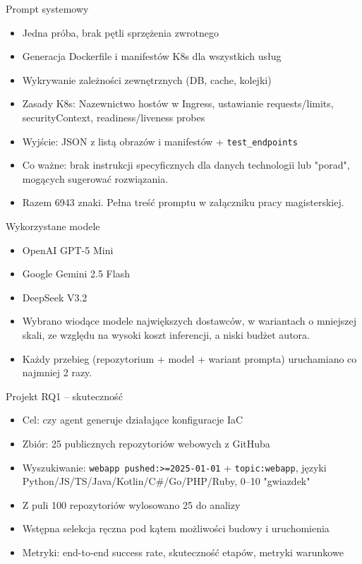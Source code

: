 \documentclass[aspectratio=169]{beamer}
\begin{document}
\begin{frame}{Prompt systemowy}
    \begin{itemize}
        \item Jedna próba, brak pętli sprzężenia zwrotnego
        \item Generacja Dockerfile i manifestów K8s dla wszystkich usług
        \item Wykrywanie zależności zewnętrznych (DB, cache, kolejki)
        \item Zasady K8s: Nazewnictwo hostów w Ingress, ustawianie requests/limits, securityContext, readiness/liveness probes
        \item Wyjście: JSON z listą obrazów i manifestów + \texttt{test\_endpoints}
        \item Co ważne: brak instrukcji specyficznych dla danych technologii lub "porad", mogących sugerować rozwiązania.
        \item Razem 6943 znaki. Pełna treść promptu w załączniku pracy magisterskiej.
    \end{itemize}
\end{frame}

\begin{frame}{Wykorzystane modele}
    \begin{itemize}
        \item OpenAI GPT-5 Mini
        \item Google Gemini 2.5 Flash
        \item DeepSeek V3.2
        \item Wybrano wiodące modele największych dostawców, w wariantach o mniejszej skali, ze względu na wysoki koszt inferencji, a niski budżet autora.
        \item Każdy przebieg (repozytorium + model + wariant prompta) uruchamiano co najmniej 2 razy.
    \end{itemize}
\end{frame}

\begin{frame}{Projekt RQ1 -- skuteczność}
    \begin{itemize}
        \item Cel: czy agent generuje działające konfiguracje IaC
        \item Zbiór: 25 publicznych repozytoriów webowych z GitHuba
        \item Wyszukiwanie: \texttt{webapp pushed:>=2025-01-01} + \texttt{topic:webapp}, języki Python/JS/TS/Java/Kotlin/C\#/Go/PHP/Ruby, 0--10 "gwiazdek"
        \item Z puli 100 repozytoriów wylosowano 25 do analizy
        \item Wstępna selekcja ręczna pod kątem możliwości budowy i uruchomienia
        \item Metryki: end-to-end success rate, skuteczność etapów, metryki warunkowe
    \end{itemize}
\end{frame}
\end{document}
